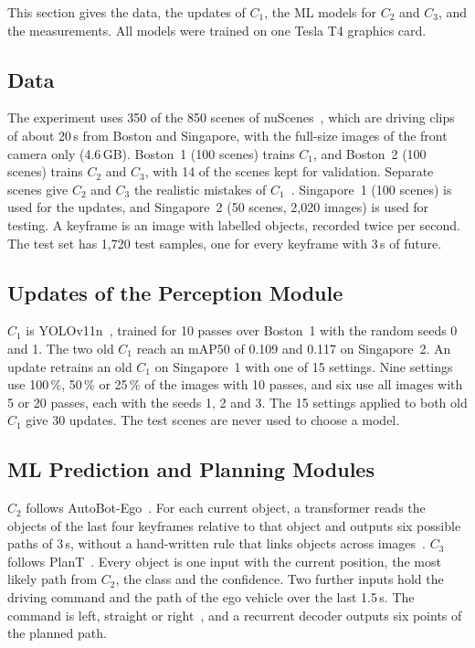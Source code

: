 \documentclass[conference]{IEEEtran}
\begin{document}
This section gives the data, the updates of $C_1$, the ML models for $C_2$
and $C_3$, and the measurements. All models were trained on one Tesla T4 graphics card.

\subsection{Data}
The experiment uses 350 of the 850 scenes of nuScenes~\cite{caesar2020nuscenes},
which are driving clips of about 20\,s from Boston and Singapore, with the
full-size images of the front camera only (4.6\,GB). Boston~1 (100 scenes) trains $C_1$, and Boston~2 (100 scenes)
trains $C_2$ and $C_3$, with 14 of the scenes kept for validation. Separate scenes give $C_2$ and $C_3$ the realistic mistakes of $C_1$~\cite{xu2024realworld}. Singapore~1 (100 scenes) is used for the updates,
and Singapore~2 (50 scenes, 2{,}020 images) is used for testing. A keyframe is an image with labelled objects, recorded twice per second. The
test set has 1{,}720 test samples, one for every keyframe with 3\,s of
future.

\subsection{Updates of the Perception Module}
$C_1$ is YOLOv11n~\cite{jocher2024yolo11}, trained for 10 passes over
Boston~1 with the random seeds 0 and 1. The two old $C_1$ reach an mAP50 of
0.109 and 0.117 on Singapore~2. An update retrains an old $C_1$ on Singapore~1
with one of 15 settings. Nine settings use 100\,\%, 50\,\% or 25\,\% of the images with 10 passes, and six use all images with 5 or 20 passes, each with the seeds 1, 2 and 3. The 15 settings
applied to both old $C_1$ give 30 updates. The test scenes are never used to choose a model.

\subsection{ML Prediction and Planning Modules}
$C_2$ follows AutoBot-Ego~\cite{girgis2022autobots}. For each current object,
a transformer reads the objects of the last four keyframes relative to that
object and outputs six possible paths of 3\,s, without a hand-written rule that links objects across images~\cite{weng2022whose}. $C_3$ follows PlanT~\cite{renz2022plant}. Every object is one input with the current position, the most likely path from $C_2$, the class and the confidence. Two further inputs hold the driving command and the path of the ego vehicle over the last 1.5\,s. The command is left, straight or right~\cite{zhai2023rethinking}, and a recurrent decoder outputs six points of the planned path.
\end{document}
